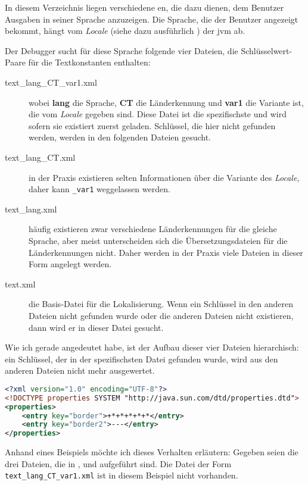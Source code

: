 In diesem Verzeichnis liegen verschiedene en, die dazu dienen, dem Benutzer Ausgaben in seiner Sprache anzuzeigen. Die Sprache, die der Benutzer angezeigt bekommt, hängt vom \emph{Locale} (siehe dazu ausführlich \cite{Oracle2010Loc}) der \gls{jvm} ab.

Der Debugger sucht für diese Sprache folgende vier Dateien, die Schlüsselwert-Paare für die Textkonstanten enthalten:
\begin{description}
\item[text_lang_CT_var1.xml] wobei \textbf{lang} die Sprache, \textbf{CT} die Länderkennung und \textbf{var1} die Variante ist, die vom \emph{Locale} gegeben sind. Diese Datei ist die spezifischste und wird sofern sie existiert zuerst geladen. Schlüssel, die hier nicht gefunden werden, werden in den folgenden Dateien gesucht.
\item[text_lang_CT.xml] in der Praxis existieren selten Informationen über die Variante des \emph{Locale}, daher kann \texttt{_var1} weggelassen werden.
\item[text_lang.xml] häufig existieren zwar verschiedene Länderkennungen für die gleiche Sprache, aber meist unterscheiden sich die Übersetzungsdateien für die Länderkennungen nicht. Daher werden in der Praxis viele Dateien in dieser Form angelegt werden.
\item[text.xml] die Basis-Datei für die Lokalisierung. Wenn ein Schlüssel in den anderen Dateien nicht gefunden wurde oder die anderen Dateien nicht existieren, dann wird er in dieser Datei gesucht.
\end{description}

Wie ich gerade angedeutet habe, ist der Aufbau dieser vier Dateien hierarchisch: ein Schlüssel, der in der spezifischsten Datei gefunden wurde, wird aus den anderen Dateien nicht mehr ausgewertet.

\begin{lstlisting}[language=XML,caption={Beispiel für Datei \texttt{text_de_DE.xml}},label=\lstlbl{locale-file-de-de}]
<?xml version="1.0" encoding="UTF-8"?>
<!DOCTYPE properties SYSTEM "http://java.sun.com/dtd/properties.dtd">
<properties>
	<entry key="border">+*+*+*+*+*</entry>
	<entry key="border2">---</entry>
</properties>
\end{lstlisting}

Anhand eines Beispiels möchte ich dieses Verhalten erläutern: Gegeben seien die drei Dateien, die in ,  und  aufgeführt sind. Die Datei der Form \texttt{text_lang_CT_var1.xml} ist in diesem Beispiel nicht vorhanden.

